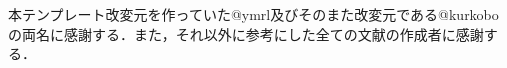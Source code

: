\begin{acknowledgment}

本テンプレート改変元を作っていた@ymrl及びそのまた改変元である@kurkoboの両名に感謝する．また，それ以外に参考にした全ての文献の作成者に感謝する．

\end{acknowledgment}
